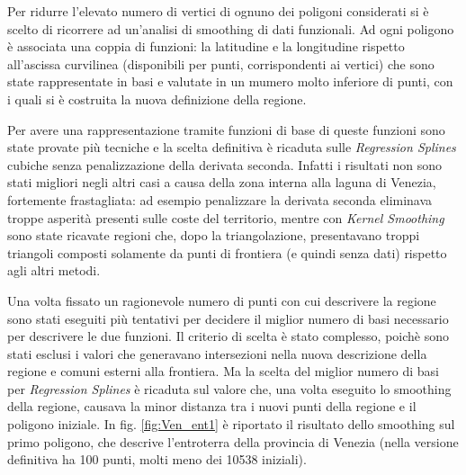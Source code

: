 \documentclass[a4paper,11pt,twoside,openright]{book}							%
\begin{document}
Per ridurre l'elevato numero di vertici di ognuno dei poligoni considerati si è scelto di ricorrere ad un'analisi di smoothing di dati funzionali. Ad ogni poligono è associata una coppia di funzioni: la latitudine e la longitudine rispetto all'ascissa curvilinea (disponibili per punti, corrispondenti ai vertici) che sono state rappresentate in basi e valutate in un mumero molto inferiore di punti, con i quali si è costruita la nuova definizione della regione.

Per avere una rappresentazione tramite funzioni di base di queste funzioni sono state provate più tecniche e la scelta definitiva è ricaduta sulle \textit{Regression Splines} cubiche senza penalizzazione della derivata seconda. Infatti i risultati non sono stati migliori negli altri casi a causa della zona interna alla laguna di Venezia, fortemente frastagliata: ad esempio penalizzare la derivata seconda eliminava troppe asperità presenti sulle coste del territorio, mentre con \textit{Kernel Smoothing} sono state ricavate regioni che, dopo la triangolazione, presentavano troppi triangoli composti solamente da punti di frontiera (e quindi senza dati) rispetto agli altri metodi.

Una volta fissato un ragionevole numero di punti con cui descrivere la regione sono stati eseguiti più tentativi per decidere il miglior numero di basi necessario per descrivere le due funzioni. Il criterio di scelta è stato complesso, poichè sono stati esclusi i valori che generavano intersezioni nella nuova descrizione della regione e comuni esterni alla frontiera. Ma la scelta del miglior numero di basi per \textit{Regression Splines} è ricaduta sul valore che, una volta eseguito lo smoothing della regione, causava la minor distanza tra i nuovi punti della regione e il poligono iniziale. In fig. \ref{fig:Ven_ent1} è riportato il risultato dello smoothing sul primo poligono, che descrive l'entroterra della provincia di Venezia (nella versione definitiva ha 100 punti, molti meno dei 10538 iniziali).  
\end{document}
